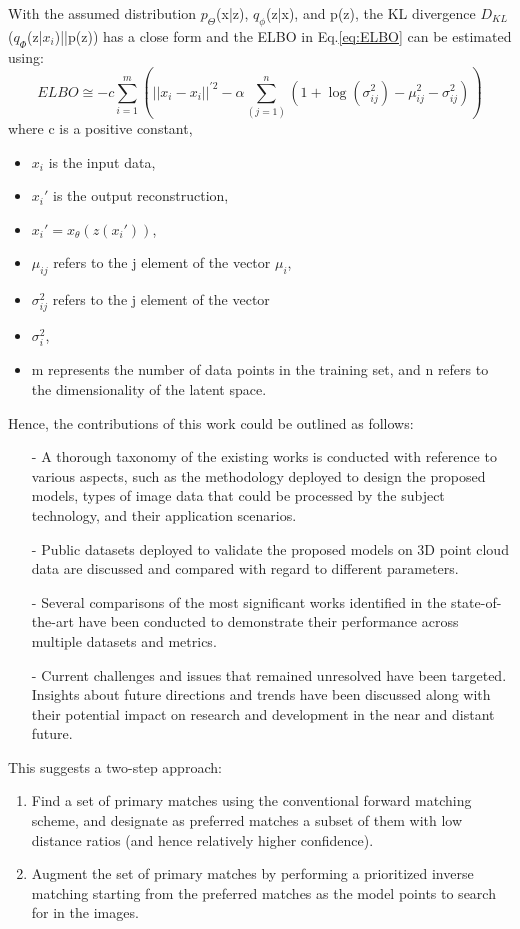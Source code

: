 \documentclass[9pt,a4paper,twoside]{tau}
\begin{document}
        With the assumed distribution $p_\Theta$(x|z), $q_\phi$(z|x), and p(z), the KL divergence $D_{KL}$($q_\Phi$(z|$x_i$)||p(z)) has a close form and the ELBO in Eq.\ref{eq:ELBO} can be estimated using:
	\begin{equation} \label{eq:ELBO}
            ELBO \cong -c \sum_{i=1}^{m} \left( ||x_i - x_i||^{'2} - \alpha \sum_{(j=1)}^{n} \left(1 + \log(\sigma_{ij}^2) - \mu_{ij}^2 - \sigma_{ij}^2 \right) \right)
        \end{equation}
        where c is a positive constant,
        \begin{itemize}
        \item $x_i$ is the input data, 
        \item $x_i'$ is the output reconstruction, 
        \item $x_i' = x_\theta(z(x_i'))$, 
        \item $\mu_{ij}$ refers to the j element of the vector $\mu_{i}$, 
        \item $\sigma_{ij}^2$ refers to the j element of the vector \item $\sigma_{i}^2$, 
        \item m represents the number of data points in the training set, and n refers to the dimensionality of the latent space.
        \end{itemize}
Hence, the contributions of this work could be outlined as follows:
    \begin{itemize}
	\item[-] A thorough taxonomy of the existing works is conducted with reference to various aspects, such as the methodology deployed to design the proposed models, types of image data that could be processed by the subject technology, and their application scenarios.
	\item[-] Public datasets deployed to validate the proposed models on 3D point cloud data are discussed and compared with regard to different parameters.
	\item[-] Several comparisons of the most significant works identified in the state-of-the-art have been conducted to demonstrate their performance across multiple datasets and metrics.
	\item[-] Current challenges and issues that remained unresolved have been targeted. Insights about future directions and trends have been discussed along with their potential impact on research and development in the near and distant future.
    \end{itemize}
This suggests a two-step approach:
\begin{enumerate}
    \item Find a set of primary matches using the conventional forward matching scheme, and designate as preferred matches a subset of them with low distance ratios (and hence relatively higher confidence).
    \item Augment the set of primary matches by performing a prioritized inverse matching starting from the preferred matches as the model points to search for in the images.
\end{enumerate}
    	
\end{document}
